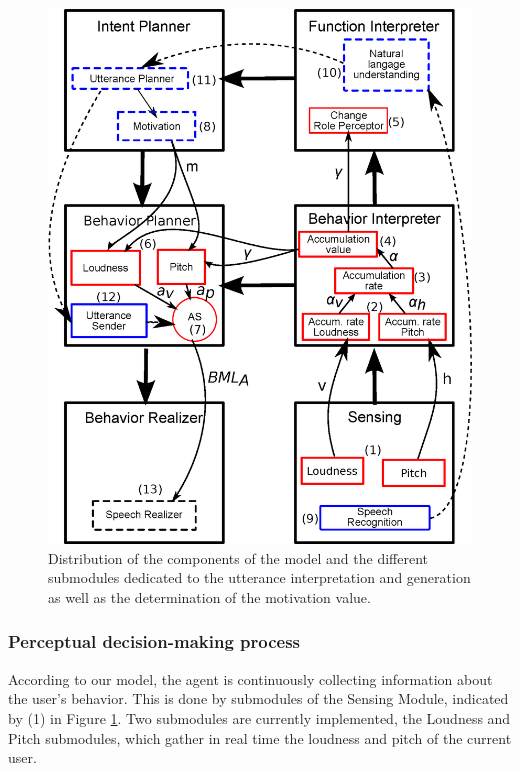 \documentclass[twocolumn]{svjour3}
\begin{document}
\begin{figure}
  \centering
  \includegraphics[width=\linewidth]{figure/impl_equ_dial.eps}
  \caption{Distribution of the components of the model and the different submodules dedicated to the utterance interpretation and generation as well as the determination of the motivation value.}
  \label{impl_modules}
\end{figure}

\subsubsection{Perceptual decision-making process}

According to our model, the agent is continuously collecting information about the user's behavior. This is done by submodules of the Sensing Module, indicated by (1) in Figure \ref{impl_modules}. Two submodules are currently implemented, the Loudness and Pitch submodules, which gather in real time the loudness and pitch of the current user. 
\end{document}
